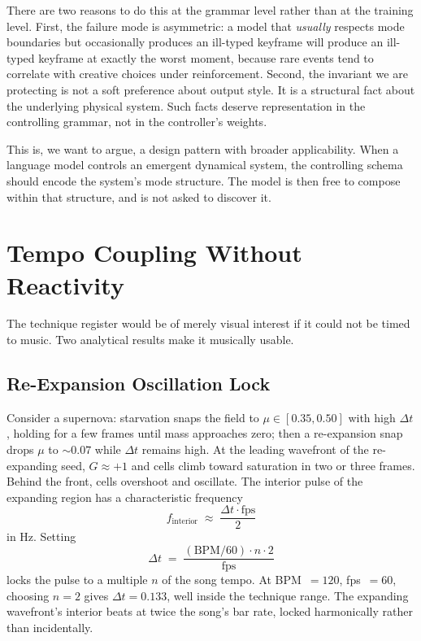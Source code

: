 \documentclass[11pt]{article}
\begin{document}
There are two reasons to do this at the grammar level rather than at the
training level. First, the failure mode is asymmetric: a model that
\emph{usually} respects mode boundaries but occasionally produces an
ill-typed keyframe will produce an ill-typed keyframe at exactly the
worst moment, because rare events tend to correlate with creative choices
under reinforcement. Second, the invariant we are protecting is not a
soft preference about output style. It is a structural fact about the
underlying physical system. Such facts deserve representation in the
controlling grammar, not in the controller's weights.

This is, we want to argue, a design pattern with broader applicability.
When a language model controls an emergent dynamical system, the controlling
schema should encode the system's mode structure. The model is then free
to compose within that structure, and is not asked to discover it.

\section{Tempo Coupling Without Reactivity}
\label{sec:tempo}

The technique register would be of merely visual interest if it could not
be timed to music. Two analytical results make it musically usable.

\subsection{Re-Expansion Oscillation Lock}

Consider a supernova: starvation snaps the field to $\mu \in [0.35, 0.50]$
with high $\Delta t$, holding for a few frames until mass approaches zero;
then a re-expansion snap drops $\mu$ to $\sim 0.07$ while $\Delta t$
remains high. At the leading wavefront of the re-expanding seed,
$G \approx +1$ and cells climb toward saturation in two or three frames.
Behind the front, cells overshoot and oscillate. The interior pulse of the
expanding region has a characteristic frequency
\begin{equation}
  f_{\text{interior}} \;\approx\; \frac{\Delta t \cdot \mathrm{fps}}{2}
\end{equation}
in Hz. Setting
\begin{equation}
  \Delta t \;=\; \frac{(\text{BPM}/60) \cdot n \cdot 2}{\mathrm{fps}}
\end{equation}
locks the pulse to a multiple $n$ of the song tempo. At BPM~$=120$,
fps~$=60$, choosing $n=2$ gives $\Delta t = 0.133$, well inside the
technique range. The expanding wavefront's interior beats at twice the
song's bar rate, locked harmonically rather than incidentally.
\end{document}
